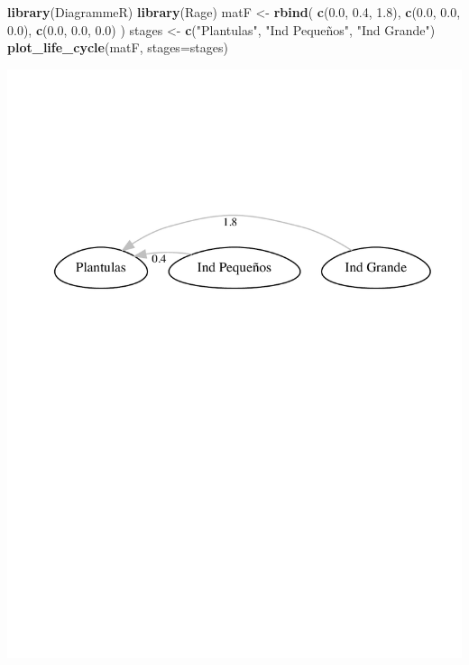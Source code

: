 \documentclass[
]{book}
\newenvironment{Shaded}{\begin{snugshade}}{\end{snugshade}}
\newcommand{\AttributeTok}[1]{\textcolor[rgb]{0.13,0.29,0.53}{#1}}
\newcommand{\FloatTok}[1]{\textcolor[rgb]{0.00,0.00,0.81}{#1}}
\newcommand{\FunctionTok}[1]{\textcolor[rgb]{0.13,0.29,0.53}{\textbf{#1}}}
\newcommand{\NormalTok}[1]{#1}
\newcommand{\OtherTok}[1]{\textcolor[rgb]{0.56,0.35,0.01}{#1}}
\newcommand{\StringTok}[1]{\textcolor[rgb]{0.31,0.60,0.02}{#1}}
\theoremstyle{definition}
\theoremstyle{definition}
\theoremstyle{definition}
\theoremstyle{definition}
\theoremstyle{remark}
\begin{document}
\begin{Shaded}
\begin{Highlighting}[]
\FunctionTok{library}\NormalTok{(DiagrammeR)}
\FunctionTok{library}\NormalTok{(Rage)}
\NormalTok{matF }\OtherTok{\textless{}{-}} \FunctionTok{rbind}\NormalTok{(}
  \FunctionTok{c}\NormalTok{(}\FloatTok{0.0}\NormalTok{, }\FloatTok{0.4}\NormalTok{, }\FloatTok{1.8}\NormalTok{),}
  \FunctionTok{c}\NormalTok{(}\FloatTok{0.0}\NormalTok{, }\FloatTok{0.0}\NormalTok{, }\FloatTok{0.0}\NormalTok{),}
  \FunctionTok{c}\NormalTok{(}\FloatTok{0.0}\NormalTok{, }\FloatTok{0.0}\NormalTok{, }\FloatTok{0.0}\NormalTok{)}
\NormalTok{)}
\NormalTok{stages }\OtherTok{\textless{}{-}} \FunctionTok{c}\NormalTok{(}\StringTok{"Plantulas"}\NormalTok{, }\StringTok{"Ind Pequeños"}\NormalTok{, }\StringTok{"Ind Grande"}\NormalTok{)}
\FunctionTok{plot\_life\_cycle}\NormalTok{(matF, }\AttributeTok{stages=}\NormalTok{stages)}
\end{Highlighting}
\end{Shaded}

\includegraphics{Diagnostico_Poblacional_files/figure-latex/chap6_2-1.pdf}
\end{document}
